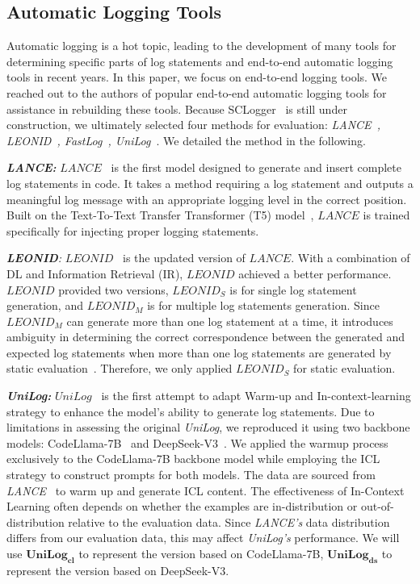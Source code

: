 \subsection{Automatic Logging Tools}
Automatic logging is a hot topic, leading to the development of many tools for determining specific parts of log statements and end-to-end automatic logging tools in recent years. In this paper, we focus on end-to-end logging tools. We reached out to the authors of popular end-to-end automatic logging tools for assistance in rebuilding these tools. Because SCLogger~\cite{Li2024GoSC} is still under construction,
we ultimately selected four methods for evaluation: \textit{LANCE~\cite{Mastropaolo2022UsingDL}, LEONID~\cite{Mastropaolo2023LogSG}, FastLog~\cite{xie2024fastlog}, UniLog~\cite{Xu2024UniLogAL}}. We detailed the method in the following.

\textit{\textbf{LANCE:}} \(LANCE\)~\cite{Mastropaolo2022UsingDL} is the first model designed to generate and insert complete log statements in code. It takes a method requiring a log statement and outputs a meaningful log message with an appropriate logging level in the correct position. Built on the Text-To-Text Transfer Transformer (T5) model~\cite{Raffel2019ExploringTL}, \(LANCE\) is trained specifically for injecting proper logging statements.

\textit{\textbf{LEONID}:} \(LEONID\)~\cite{Mastropaolo2023LogSG} is the updated version of \(LANCE\). With a combination of DL and Information Retrieval (IR), \(LEONID\) achieved a better performance. \(LEONID\) provided two versions, \(LEONID_S\) is for single log statement generation, and \(LEONID_M\) is for multiple log statements generation. Since \(LEONID_M\) can generate more than one log statement at a time, it introduces ambiguity in determining the correct correspondence between the generated and expected log statements when more than one log statements are generated by static evaluation~\cite{Mastropaolo2023LogSG}. Therefore, we only applied \(LEONID_S\) for static evaluation.

\textit{\textbf{UniLog:}} \(UniLog\)~\cite{Xu2024UniLogAL} is the first attempt to adapt Warm-up and In-context-learning strategy to enhance the model's ability to generate log statements.
Due to limitations in assessing the original \textit{UniLog}, we reproduced it using two backbone models: CodeLlama-7B~\cite{Rozire2023CodeLO} and DeepSeek-V3~\cite{DeepSeekAI2024DeepSeekV3TR}. We applied the warmup process exclusively to the CodeLlama-7B backbone model while employing the ICL strategy to construct prompts for both models.
The data are sourced from \textit{LANCE}~\cite{Mastropaolo2022UsingDL} to warm up and generate ICL content. The effectiveness of In-Context Learning often depends on whether the examples are in-distribution or out-of-distribution relative to the evaluation data. Since \textit{LANCE’s} data distribution differs from our evaluation data, this may affect \textit{UniLog’s} performance. We will use \(\bm{UniLog_{{cl}}}\) to represent the version based on CodeLlama-7B, \(\bm{UniLog_{{ds}}}\) to represent the version based on DeepSeek-V3.

